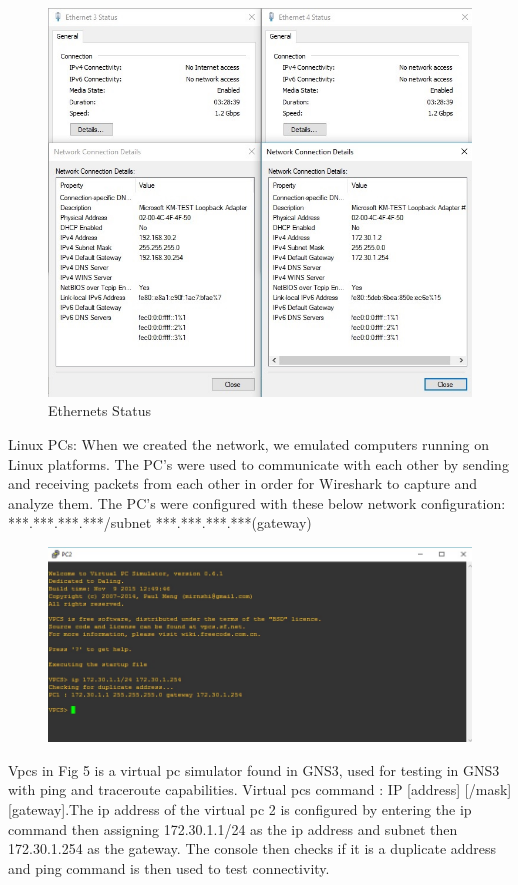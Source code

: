 \documentclass{article}
\begin{document}
\begin{figure}[H]
	\begin{center}
		\includegraphics[width=0.6
\textwidth]{Ethernet.jpg}
	\end{center}
	\caption{\small Ethernets Status \newline}
	\label{fig:StatusEth}
\end{figure}


Linux PCs: When we created the network, we emulated computers running on Linux platforms. The PC's were used to communicate with each other by sending and receiving packets from each other in order for Wireshark to capture and analyze them. The PC's were configured with these below network configuration:\newline
***.***.***.***/subnet\newline
***.***.***.***(gateway)

\begin{figure}[H]
	\begin{center}
		\includegraphics[width=0.6
\textwidth]{VPC.jpg}
	\end{center}
	\caption{\small  \newline}
	\label{fig:VPC}
\end{figure}
Vpcs in Fig 5 is a virtual pc simulator found in GNS3, used for testing in GNS3 with ping and traceroute capabilities. Virtual pcs command : IP [address] [/mask] [gateway].The ip address of the virtual pc 2 is configured by entering the ip command then assigning 172.30.1.1/24 as the ip address and subnet then 172.30.1.254 as the gateway. The console then checks if it is a duplicate address and ping command is then used to test connectivity.
\end{document}
